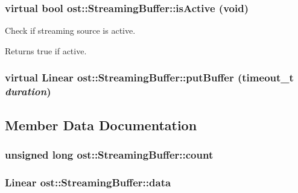 \subsubsection[{isActive}]{\setlength{\rightskip}{0pt plus 5cm}virtual bool ost::StreamingBuffer::isActive (void)\hspace{0.3cm}{\ttfamily  [virtual]}}\label{classost_1_1_streaming_buffer_a8e0aaec1b441193496b8abaa8932e448}


Check if streaming source is active. \begin{DoxyReturn}{Returns}
true if active. 
\end{DoxyReturn}
\subsubsection[{putBuffer}]{\setlength{\rightskip}{0pt plus 5cm}virtual Linear ost::StreamingBuffer::putBuffer (timeout\_\-t {\em duration})\hspace{0.3cm}{\ttfamily  [protected, virtual]}}\label{classost_1_1_streaming_buffer_abc144a2a9d06e59c1e3c6147b9408407}


\subsection{Member Data Documentation}
\subsubsection[{count}]{\setlength{\rightskip}{0pt plus 5cm}unsigned long {\bf ost::StreamingBuffer::count}\hspace{0.3cm}{\ttfamily  [protected]}}\label{classost_1_1_streaming_buffer_affe07faba8f3a0a5bf6f09d550800dcf}
\subsubsection[{data}]{\setlength{\rightskip}{0pt plus 5cm}Linear {\bf ost::StreamingBuffer::data}\hspace{0.3cm}{\ttfamily  [protected]}}\label{classost_1_1_streaming_buffer_afd7fdfb51cecb4edd72d54db9cdbdca9}
